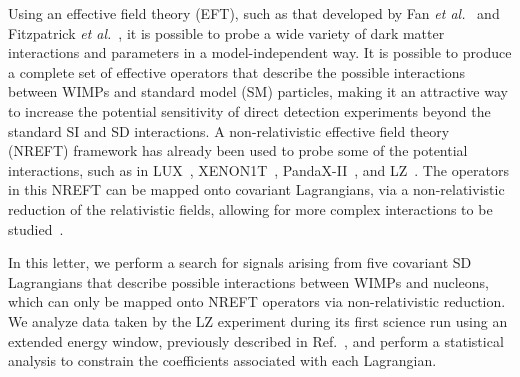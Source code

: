 \documentclass[reprint, showpacs,
preprintnumbers,
amsmath,amssymb,
aps, floatfix,
superscriptaddress,
prd, nofootinbib]{revtex4-1}
\begin{document}
Using an effective field theory (EFT), such as that developed by Fan \textit{et al.}~\cite{Fan_2010} and Fitzpatrick \textit{et al.}~\cite{Fitzpatrick:EFT}, it is possible to probe a wide variety of dark matter interactions and parameters in a model-independent way. 
It is possible to produce a complete set of effective operators that describe the possible interactions between WIMPs and standard model (SM) particles, making it an attractive way to increase the potential sensitivity of direct detection experiments beyond the standard SI and SD interactions.
A non-relativistic effective field theory (NREFT) framework has already been used to probe some of the potential interactions, such as in LUX~\cite{LUX:EFTR4_2021}, XENON1T~\cite{Xenon1t:2vec_2019}, PandaX-II~\cite{PandaX2:SD_EFT_2019}, and LZ~\cite{LZ:SR1_NREFT_2023}.
The operators in this NREFT can be mapped onto covariant Lagrangians, via a non-relativistic reduction of the relativistic fields, allowing for more complex interactions to be studied~\cite{Fan_2010, Fitzpatrick:EFT}.

In this letter, we perform a search for signals arising from five covariant SD Lagrangians that describe possible interactions between WIMPs and nucleons, which can only be mapped onto NREFT operators via non-relativistic reduction.
We analyze data taken by the LZ experiment during its first science run using an extended energy window, previously described in Ref.~\cite{LZ:SR1_NREFT_2023}, and perform a statistical analysis to constrain the coefficients associated with each Lagrangian.
\end{document}
